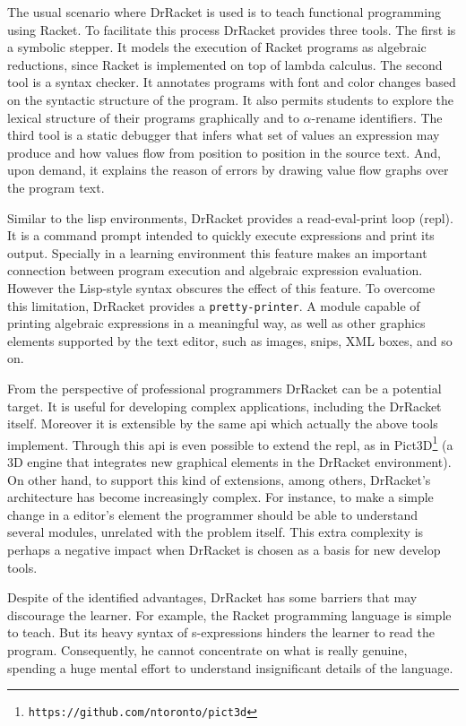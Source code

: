 The usual scenario where DrRacket is used is to teach functional programming using Racket. To facilitate this process DrRacket provides three tools. The first is a symbolic stepper. It models the execution of Racket programs as algebraic reductions, since Racket is implemented on top of lambda calculus. The second tool is a syntax checker. It annotates programs with font and color changes based on the syntactic structure of the program. It also permits students to explore the lexical structure of their programs graphically and to $\alpha$-rename identifiers. The third tool is a static debugger that infers what set of values an expression may produce and how values flow from position to position in the source text. And, upon demand, it explains the reason of errors by drawing value flow graphs over the program text.

Similar to the lisp environments, DrRacket provides a read-eval-print loop (\ac{repl}). It is a command prompt intended to quickly execute expressions and print its output. Specially in a learning environment this feature makes an important connection between program execution and algebraic expression evaluation. However the Lisp-style syntax obscures the effect of this feature. To overcome this limitation, DrRacket provides a \texttt{pretty-printer}. A module capable of printing algebraic expressions in a meaningful way, as well as other graphics elements supported by the text editor, such as images, snips, XML boxes, and so on.

From the perspective of professional programmers DrRacket can be a potential target. It is useful for developing complex applications, including the DrRacket itself. Moreover it is extensible by the same \ac{api} which actually the above tools implement. Through this \ac{api} is even possible to extend the \ac{repl}, as in Pict3D\footnote{\texttt{https://github.com/ntoronto/pict3d}} (a 3D engine that integrates new graphical elements in the DrRacket environment). On other hand, to support this kind of extensions, among others, DrRacket's architecture has become increasingly complex. For instance, to make a simple change in a editor's element the programmer should be able to understand several modules, unrelated with the problem itself. This extra complexity is perhaps a negative impact when DrRacket is chosen as a basis for new develop tools.

Despite of the identified advantages, DrRacket has some barriers that may discourage the learner. For example, the Racket programming language is simple to teach. But its heavy syntax of s-expressions hinders the learner to read the program. Consequently, he cannot concentrate on what is really genuine, spending a huge mental effort to understand insignificant details of the language.
